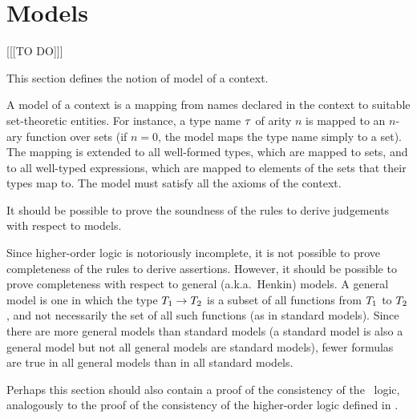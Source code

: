 \section{Models}
\label{models}

[[[TO DO]]]

This section defines the notion of model of a context.

A model of a context is a mapping from names declared in the context to suitable
set-theoretic entities. For instance, a type name $\tau$ of arity $n$ is mapped
to an $n$-ary function over sets (if $n=0$, the model maps the type name simply
to a set). The mapping is extended to all well-formed types, which are mapped to
sets, and to all well-typed expressions, which are mapped to elements of the
sets that their types map to. The model must satisfy all the axioms of the
context.

It should be possible to prove the soundness of the rules to derive judgements
with respect to models.

Since higher-order logic is notoriously incomplete, it is not possible to prove
completeness of the rules to derive assertions. However, it should be possible
to prove completeness with respect to general (a.k.a.\ Henkin) models. A general
model is one in which the type $T_1\to T_2$ is a subset of all functions from
$T_1$ to $T_2$, and not necessarily the set of all such functions (as in
standard models). Since there are more general models than standard models (a
standard model is also a general model but not all general models are standard
models), fewer formulas are true in all general models than in all standard
models.

Perhaps this section should also contain a proof of the consistency of the \MS\
logic, analogously to the proof of the consistency of the higher-order logic
defined in \cite{andrews}.

